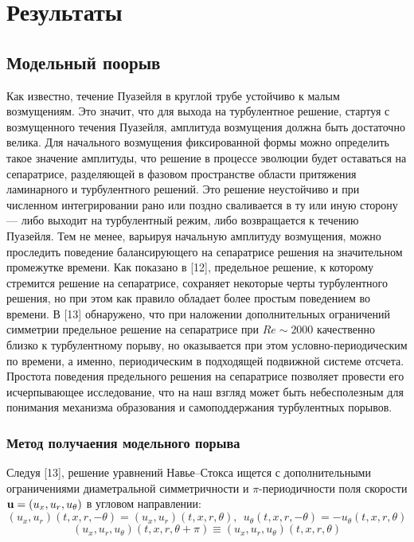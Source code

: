 
\chapter{Результаты}

\section{Модельный поорыв} 

Как известно, течение Пуазейля в круглой трубе устойчиво к малым возмущениям. Это значит, что для выхода на турбулентное решение, стартуя с возмущенного течения Пуазейля, амплитуда возмущения должна быть достаточно велика. Для начального возмущения фиксированной формы можно определить такое значение амплитуды, что решение в процессе эволюции будет оставаться на сепаратрисе, разделяющей в фазовом пространстве области притяжения ламинарного и турбулентного решений. Это решение неустойчиво и при численном интегрировании рано или поздно сваливается в ту или иную сторону --- либо выходит на турбулентный режим, либо возвращается к течению Пуазейля. Тем не менее, варьируя начальную амплитуду возмущения, можно проследить поведение балансирующего на сепаратрисе решения на значительном промежутке времени. Как показано в [12], предельное решение, к которому стремится решение на сепаратрисе, сохраняет некоторые черты турбулентного решения, но при этом как правило обладает более простым поведением во времени. В [13] обнаружено, что при наложении дополнительных ограничений симметрии предельное решение на сепаратрисе при $Re\sim2000$ качественно близко к турбулентному порыву, но оказывается при этом условно-периодическим по времени, а именно, периодическим в подходящей подвижной системе отсчета. Простота поведения предельного решения на сепаратрисе позволяет провести его исчерпывающее исследование, что на наш взгляд может быть небесполезным для понимания  механизма образования и самоподдержания турбулентных порывов.


\subsection{Метод получаения модельного порыва}

Следуя [13], решение уравнений Навье--Стокса ищется с дополнительными ограничениями диаметральной симметричности и $\pi$-периодичности поля скорости $\mathbf{u}=(u_x,u_r,u_\theta)$ в угловом направлении:
\begin{equation}
  (u_x,u_r)(t,x,r,-\theta)=(u_x,u_r)(t,x,r,\theta),\ \ u_\theta(t,x,r,-\theta)=-u_\theta(t,x,r,\theta)
 \label{sym}
\end{equation}
\begin{equation}
  (u_x,u_r,u_\theta)(t,x,r,\theta+\pi)\equiv(u_x,u_r,u_\theta)(t,x,r,\theta)
 \label{per}
\end{equation}

